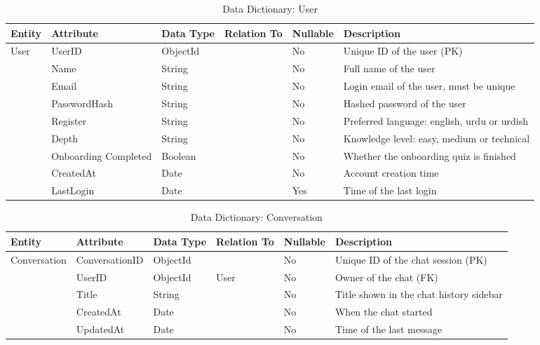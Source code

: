 \documentclass{FastFyp}
\begin{document}
\begin{table}[H]
\centering
\small
\setlength{\tabcolsep}{4pt}
\caption{Data Dictionary: User}
\begin{tabular}{|p{2.0cm}|p{2.5cm}|p{1.7cm}|p{1.9cm}|p{1.3cm}|p{4.6cm}|}
\hline
\textbf{Entity} & \textbf{Attribute} & \textbf{Data Type} & \textbf{Relation To} & \textbf{Nullable} & \textbf{Description} \\ \hline
User & UserID & ObjectId & & No & Unique ID of the user (PK) \\ \cline{2-6}
 & Name & String & & No & Full name of the user \\ \cline{2-6}
 & Email & String & & No & Login email of the user, must be unique \\ \cline{2-6}
 & PasswordHash & String & & No & Hashed password of the user \\ \cline{2-6}
 & Register & String & & No & Preferred language: english, urdu or urdish \\ \cline{2-6}
 & Depth & String & & No & Knowledge level: easy, medium or technical \\ \cline{2-6}
 & Onboarding Completed & Boolean & & No & Whether the onboarding quiz is finished \\ \cline{2-6}
 & CreatedAt & Date & & No & Account creation time \\ \cline{2-6}
 & LastLogin & Date & & Yes & Time of the last login \\ \hline
\end{tabular}
\end{table}

\begin{table}[H]
\centering
\small
\setlength{\tabcolsep}{4pt}
\caption{Data Dictionary: Conversation}
\begin{tabular}{|p{2.0cm}|p{2.5cm}|p{1.7cm}|p{1.9cm}|p{1.3cm}|p{4.6cm}|}
\hline
\textbf{Entity} & \textbf{Attribute} & \textbf{Data Type} & \textbf{Relation To} & \textbf{Nullable} & \textbf{Description} \\ \hline
Conversation & ConversationID & ObjectId & & No & Unique ID of the chat session (PK) \\ \cline{2-6}
 & UserID & ObjectId & User & No & Owner of the chat (FK) \\ \cline{2-6}
 & Title & String & & No & Title shown in the chat history sidebar \\ \cline{2-6}
 & CreatedAt & Date & & No & When the chat started \\ \cline{2-6}
 & UpdatedAt & Date & & No & Time of the last message \\ \hline
\end{tabular}
\end{table}
\end{document}
